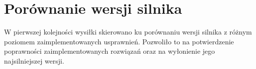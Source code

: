 \section {Porównanie wersji silnika}
\label {sec: porownanie-wersji-silnika}

W pierwszej kolejności wysiłki skierowano ku porównaniu wersji silnika z różnym poziomem zaimplementowanych usprawnień.
Pozwoliło to na potwierdzenie poprawności zaimplementowanych rozwiązań oraz na wyłonienie jego najsilniejszej wersji.


